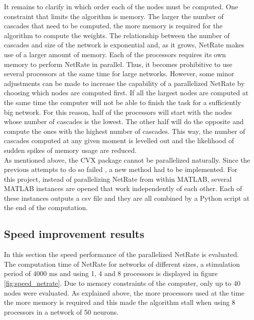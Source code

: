 It remains to clarify in which order each of the nodes must be computed. One constraint that limits the algorithm is memory. The larger the number of cascades that need to be computed, the more memory is required for the algorithm to compute the weights. The relationship between the number of cascades and size of the network is exponential and, as it grows, NetRate makes use of a larger amount of memory. Each of the processors requires its own memory to perform NetRate in parallel. Thus, it becomes prohibitive to use several processors at the same time for large networks. However, some minor adjustments can be made to increase the capability of a parallelized NetRate by choosing which nodes are computed first. If all the largest nodes are computed at the same time the computer will not be able to finish the task for a sufficiently big network. For this reason, half of the processors will start with the nodes whose number of cascades is the lowest. The other half will do the opposite and compute the ones with the highest number of cascades. This way, the number of cascades computed at any given moment is levelled out and the likelihood of sudden spikes of memory usage are reduced. \\

As mentioned above, the CVX package cannot be parallelized naturally. Since the previous attempts to do so failed \cite{pranav_report}, a new method had to be implemented. For this project, instead of parallelizing NetRate from within MATLAB, several MATLAB instances are opened that work independently of each other. Each of these instances outputs a csv file and they are all combined by a Python script at the end of the computation. 

\subsection{Speed improvement results}

In this section the speed performance of the parallelized NetRate is evaluated. The computation time of NetRate for networks of different sizes, a stimulation period of 4000 ms and using 1, 4 and 8 processors is displayed in figure \ref{fig:speed_netrate}. Due to memory constraints of the computer, only up to 40 nodes were evaluated. As explained above, the more processors used at the time the more memory is required and this made the algorithm stall when using 8 processors in a network of 50 neurons.\\

